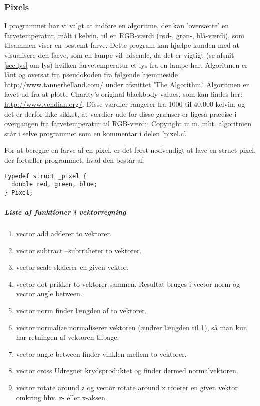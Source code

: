 \subsubsection{Pixels}
I programmet har vi valgt at indføre en algoritme, der kan ’oversætte’ en farvetemperatur, målt i kelvin, til en RGB-værdi (rød-, grøn-, blå-værdi), som tilsammen viser en bestemt farve. Dette program kan hjælpe kunden med at visualisere den farve, som en lampe vil udsende, da det er vigtigt (se afsnit \ref{sec:lys} om lys) hvilken farvetemperatur et lys fra en lampe har. Algoritmen er lånt og oversat fra pseudokoden fra følgende hjemmeside \href{http://www.tannerhelland.com/4435/convert-temperature-rgb-algorithm-code/}{http://www.tannerhelland.com/} under afsnittet 'The Algorithm'. Algoritmen er lavet ud fra at plotte Charity’s original blackbody values, som kan findes her: \href{http://www.vendian.org/mncharity/dir3/blackbody/UnstableURLs/bbr_color.html}{http://www.vendian.org/}. Disse værdier rangerer fra 1000 til 40.000 kelvin, og det er derfor ikke sikket, at værdier ude for disse grænser er ligeså præcise i overgangen fra farvetemperatur til RGB-værdi. Copyright m.m. mht. algoritmen står i selve programmet som en kommentar i delen ’pixel.c’.


For at beregne en farve af en pixel, er det først nødvendigt at lave en struct pixel, der fortæller programmet, hvad den består af. 
\begin{lstlisting}[style=Cstyle, caption=vector dot]
typedef struct _pixel {
  double red, green, blue;
} Pixel;
\end{lstlisting}

\subparagraph{Liste af funktioner i vektorregning}
\begin{enumerate}

  \item vector add adderer to vektorer.
  \item vector subtract –subtraherer to vektorer.
  \item vector scale skalerer en given vektor.
  \item vector dot prikker to vektorer sammen. Resultat bruges i vector norm og vector angle between.
  \item vector norm finder længden af to vektorer.
  \item vector normalize normaliserer vektoren (ændrer længden til 1), så man kun har retningen af vektoren tilbage.
  \item vector angle between finder vinklen mellem to vektorer.
  \item vector cross Udregner krydsproduktet og finder dermed normalvektoren.
  \item vector rotate around z og vector rotate around x roterer en given vektor omkring hhv. z- eller x-aksen.

\end{enumerate}